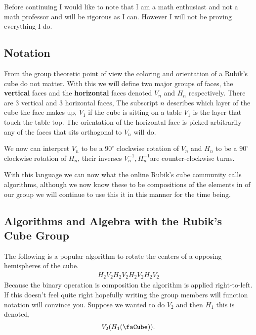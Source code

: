 \documentclass{article}
\begin{document}
\bigskip
Before continuing I would like to note that I am a math enthusiast and not a math professor and will be rigorous as I can. However I will not be proving everything I do.

\subsection{Notation}
From the group theoretic point of view the coloring and orientation of a Rubik's cube do not matter. %
With this we will define two major groups of faces, the \textbf{vertical} faces and the \textbf{horizontal} faces denoted $V_{n}$ and $H_{n}$ respectively.
There are 3 vertical and 3 horizontal faces,
The subscript $n$ describes which layer of the cube the face makes up, $V_{1}$ if the cube is sitting on a table $V_{1}$ is the layer that touch the table top.
The orientation of the horizontal face is picked arbitrarily any of the faces that sits orthogonal to $V_{n}$ will do.

We now can interpret $V_{n}$ to be a $90^{\circ}$ clockwise rotation of $V_{n}$ and $H_{n}$ to be a $90^{\circ}$ clockwise rotation of $H_{n}$, their inverses $V_{n}^{-1},H_{n}^{-1}$are counter-clockwise turns.


With this language we can now what the online Rubik's cube community calls algorithms, although we now know these to be compositions of the elements in of our group we will continue to use this it in this manner for the time being.
\subsection{Algorithms and Algebra with the Rubik's Cube Group}
The following is a popular algorithm to rotate the centers of a opposing hemispheres of the cube.
\begin{align}
    H_{2}V_{2}H_{2}V_{2}H_{2}V_{2}H_{2}V_{2} \label{eq1}
\end{align}
Because the binary operation is composition the algorithm is applied right-to-left. If this doesn't feel quite right hopefully writing the group members will function notation will convince you. Suppose we wanted to do $V_{2}$ and then $H_{1}$ this is denoted,
\begin{align*}
    V_{2}(H_{1}(\text{\faCube})).
\end{align*}
\end{document}
